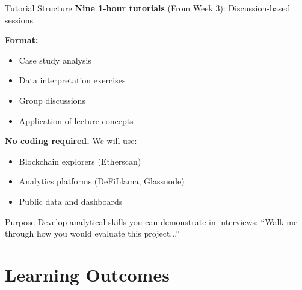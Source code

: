 \documentclass[10pt]{beamer}
\begin{document}
\begin{frame}{Tutorial Structure}
  \textbf{Nine 1-hour tutorials} (From Week 3): Discussion-based sessions
  
  \vspace{1em}
  \textbf{Format:}
  \begin{itemize}
    \item Case study analysis
    \item Data interpretation exercises
    \item Group discussions
    \item Application of lecture concepts
  \end{itemize}
  
  \vspace{1em}
  \textbf{No coding required.} We will use:
  \begin{itemize}
    \item Blockchain explorers (Etherscan)
    \item Analytics platforms (DeFiLlama, Glassnode)
    \item Public data and dashboards
  \end{itemize}
  
  \vspace{1em}
  \begin{block}{Purpose}
    Develop analytical skills you can demonstrate in interviews: ``Walk me through how you would evaluate this project...''
  \end{block}
\end{frame}

\section{Learning Outcomes}
\end{document}
